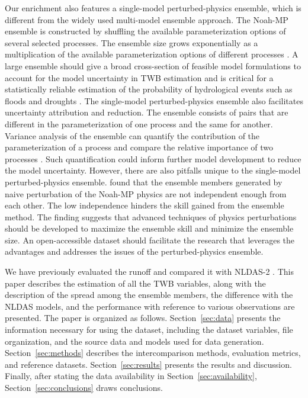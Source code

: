 \documentclass[essd, manuscript]{copernicus}
\begin{document}
Our enrichment also features a single-model perturbed-physics ensemble, which is different from the widely used multi-model ensemble approach. The Noah-MP ensemble is constructed by shuffling the available parameterization options of several selected processes. The ensemble size grows exponentially as a multiplication of the available parameterization options of different processes \citep{yang2011JGRA, zhang2016JGRA, gan2019WRR}. A large ensemble should give a broad cross-section of feasible model formulations to account for the model uncertainty in TWB estimation \citep{telteu2021GMD, mitchell2004JGRA} and is critical for a statistically reliable estimation of the probability of hydrological events such as floods and droughts \citep{troin2021WRR}. The single-model perturbed-physics ensemble also facilitates uncertainty attribution and reduction. The ensemble consists of pairs that are different in the parameterization of one process and the same for another. Variance analysis of the ensemble can quantify the contribution of the parameterization of a process and compare the relative importance of two processes \citep{zheng2019WRR, clark2011WRR}. Such quantification could inform further model development to reduce the model uncertainty. However, there are also pitfalls unique to the single-model perturbed-physics ensemble. \citet{fei2021WRR} found that the ensemble members generated by naive perturbation of the Noah-MP physics are not independent enough from each other. The low independence hinders the skill gained from the ensemble method. The finding suggests that advanced techniques of physics perturbations should be developed to maximize the ensemble skill and minimize the ensemble size. An open-accessible dataset should facilitate the research that leverages the advantages and addresses the issues of the perturbed-physics ensemble.

We have previously evaluated the runoff and compared it with NLDAS-2 \citep{fei2021WRR}. This paper describes the estimation of all the TWB variables, along with the description of the spread among the ensemble members, the difference with the NLDAS models, and the performance with reference to various observations are presented. The paper is organized as follows. Section~\ref{sec:data} presents the information necessary for using the dataset, including the dataset variables, file organization, and the source data and models used for data generation. Section~\ref{sec:methods} describes the intercomparison methods, evaluation metrics, and reference datasets. Section~\ref{sec:results} presents the results and discussion. Finally, after stating the data availability in Section~\ref{sec:availability}, Section~\ref{sec:conclusions} draws conclusions.
\end{document}

